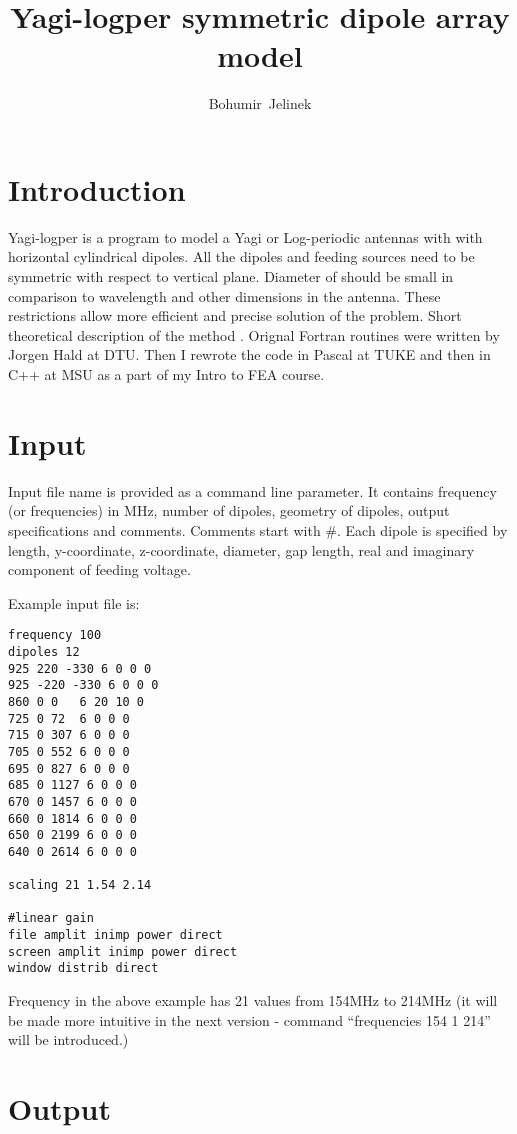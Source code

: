 \documentclass{article}
\author{Bohumir~Jelinek}
\title{Yagi-logper symmetric dipole array model}
\begin{document}
\maketitle
\tableofcontents

\section{Introduction}

Yagi-logper is a program to model a Yagi or Log-periodic antennas with
with horizontal cylindrical dipoles. All the dipoles and feeding
sources need to be symmetric with respect to vertical plane. Diameter
of should be small in comparison to wavelength and other dimensions in
the antenna. These restrictions allow more efficient and precise
solution of the problem. Short theoretical description of the method
.
Orignal Fortran routines were written by Jorgen Hald at DTU. Then I
rewrote the code in Pascal at TUKE and then in C++ at MSU as a part of
my Intro to FEA course.

\section{Input}

Input file name is provided as a command line parameter. It contains
frequency (or frequencies) in MHz, number of dipoles, geometry of
dipoles, output specifications and comments. Comments start with \#.
Each dipole is specified by length, y-coordinate, z-coordinate,
diameter, gap length, real and imaginary component of feeding voltage.

Example input file is:
\begin{verbatim}
frequency 100
dipoles 12
925 220 -330 6 0 0 0
925 -220 -330 6 0 0 0
860 0 0   6 20 10 0
725 0 72  6 0 0 0
715 0 307 6 0 0 0
705 0 552 6 0 0 0
695 0 827 6 0 0 0
685 0 1127 6 0 0 0
670 0 1457 6 0 0 0
660 0 1814 6 0 0 0
650 0 2199 6 0 0 0
640 0 2614 6 0 0 0

scaling 21 1.54 2.14

#linear gain
file amplit inimp power direct
screen amplit inimp power direct
window distrib direct
\end{verbatim}

Frequency in the above example has 21 values from 154MHz to 214MHz (it
will be made more intuitive in the next version - command
``frequencies 154 1 214'' will be introduced.)

\section{Output}
\end{document}
